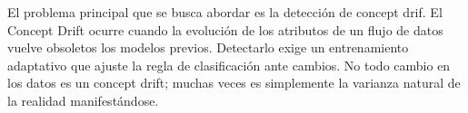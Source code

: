 El problema principal que se busca abordar es la detección de concept drif. El Concept Drift ocurre cuando la evolución de los atributos de un flujo de datos vuelve obsoletos los modelos previos. Detectarlo exige un entrenamiento adaptativo que ajuste la regla de clasificación ante cambios. 
No todo cambio en los datos es un concept drift; muchas veces es simplemente la varianza natural de la realidad manifestándose.


